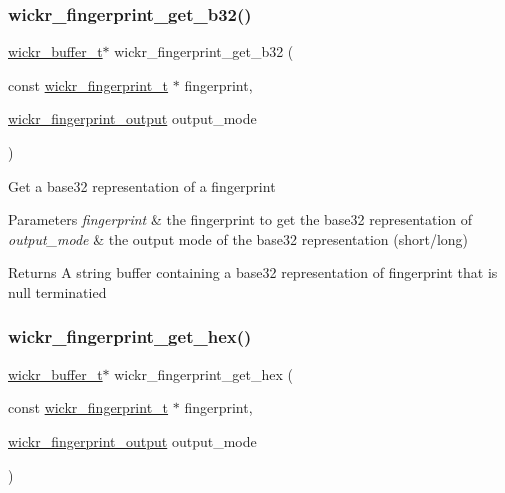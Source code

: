 \subsubsection{\texorpdfstring{wickr\_fingerprint\_get\_b32()}{wickr\_fingerprint\_get\_b32()}}
{\footnotesize\ttfamily \mbox{\hyperlink{structwickr__buffer}{wickr\+\_\+buffer\+\_\+t}}$\ast$ wickr\+\_\+fingerprint\+\_\+get\+\_\+b32 (\begin{DoxyParamCaption}\item[{const \mbox{\hyperlink{structwickr__fingerprint}{wickr\+\_\+fingerprint\+\_\+t}} $\ast$}]{fingerprint,  }\item[{\mbox{\hyperlink{group__wickr__fingerprint_gafaac3f13daae0b97e91f3fb744f4c9e2}{wickr\+\_\+fingerprint\+\_\+output}}}]{output\+\_\+mode }\end{DoxyParamCaption})}

Get a base32 representation of a fingerprint


\begin{DoxyParams}{Parameters}
{\em fingerprint} & the fingerprint to get the base32 representation of \\
\hline
{\em output\+\_\+mode} & the output mode of the base32 representation (short/long) \\
\hline
\end{DoxyParams}
\begin{DoxyReturn}{Returns}
A string buffer containing a base32 representation of \textquotesingle{}fingerprint\textquotesingle{} that is null terminatied 
\end{DoxyReturn}
\mbox{\label{group__wickr__fingerprint_ga50608413a9168b144e06d7537a789df1}} 
\subsubsection{\texorpdfstring{wickr\_fingerprint\_get\_hex()}{wickr\_fingerprint\_get\_hex()}}
{\footnotesize\ttfamily \mbox{\hyperlink{structwickr__buffer}{wickr\+\_\+buffer\+\_\+t}}$\ast$ wickr\+\_\+fingerprint\+\_\+get\+\_\+hex (\begin{DoxyParamCaption}\item[{const \mbox{\hyperlink{structwickr__fingerprint}{wickr\+\_\+fingerprint\+\_\+t}} $\ast$}]{fingerprint,  }\item[{\mbox{\hyperlink{group__wickr__fingerprint_gafaac3f13daae0b97e91f3fb744f4c9e2}{wickr\+\_\+fingerprint\+\_\+output}}}]{output\+\_\+mode }\end{DoxyParamCaption})}

